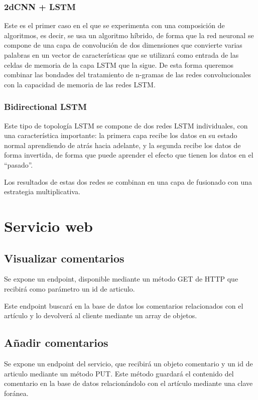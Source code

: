 \subsubsection{2dCNN + LSTM}

Este es el primer caso en el que se experimenta con una composición de algoritmos, es decir, se usa un algoritmo híbrido, de forma que la red neuronal se compone de una capa de convolución de dos dimensiones que convierte varias palabras en un vector de características que se utilizará como entrada de las celdas de memoria de la capa LSTM que la sigue. De esta forma queremos combinar las bondades del tratamiento de n-gramas de las redes convolucionales con la capacidad de memoria de las redes LSTM.

\subsubsection{Bidirectional LSTM}\label{bidi}

Este tipo de topología LSTM se compone de dos redes LSTM individuales, con una característica importante: la primera capa recibe los datos en su estado normal aprendiendo de atrás hacia adelante, y la segunda recibe los datos de forma invertida, de forma que puede aprender el efecto que tienen los datos en el ``pasado''.

Los resultados de estas dos redes se combinan en una capa de fusionado con una estrategia multiplicativa.

\section{Servicio web}


\subsection{Visualizar comentarios}

Se expone un endpoint, disponible mediante un método GET de HTTP que recibirá como parámetro un id de articulo.

Este endpoint buscará en la base de datos los comentarios relacionados con el artículo y lo devolverá al cliente mediante un array de objetos.

\subsection{Añadir comentarios}

Se expone un endpoint del servicio, que recibirá un objeto comentario y un id de articulo mediante un método PUT. Este método guardará el contenido del comentario en la base de datos relacionándolo con el artículo mediante una clave foránea.

